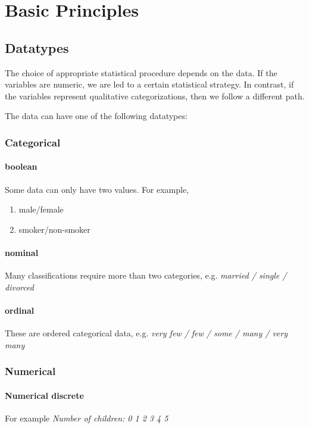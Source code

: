 \chapter{Basic Principles}

\section{Datatypes}

The choice of appropriate statistical procedure depends on the data. If the variables are numeric, we are led to a certain statistical strategy. In contrast, if the variables represent qualitative categorizations, then we follow a different path.

 The data can have one of the following datatypes:

\subsection{Categorical} 

\subsubsection{boolean}
Some data can only have two values. For example,
\begin{enumerate}
  \item male/female
  \item smoker/non-smoker
\end{enumerate}

\subsubsection{nominal}
Many classifications require more than two categories, e.g. \emph{married / single / divorced}

\subsubsection{ordinal}
These are ordered categorical data, e.g. \emph{very few / few / some / many / very many}

\subsection{Numerical}

\subsubsection{Numerical discrete}
For example \emph{Number of children: 0 1 2 3 4 5}

